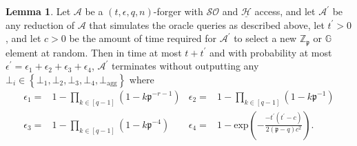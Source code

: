 \documentclass{mrl}
\theoremstyle{definition}
\numberwithin{theorem}{subsection}
\newtheorem{lemma}[theorem]{Lemma}
\newcommand{\adversary}{\mathcal{A}}
\newcommand{\group}{\mathbb{G}}
\begin{document}
\begin{lemma}\label{firstNonFail}
Let $\mathcal{A}$ be a $(t,\epsilon,q,n)$-forger with $\mathcal{SO}$ and $\underline{\mathcal{H}}$ access, and let $\adversary^\prime$ be any reduction of $\mathcal{A}$ that simulates the oracle queries as described above, let $t^\prime > 0$, and let $c > 0$ be the amount of time required for $\adversary^\prime$ to select a new $\mathbb{Z}_\mathfrak{p}$ or $\group$ element at random. Then in time at most $t+t^\prime$ and with probability at most $\epsilon^\prime = \epsilon_1 + \epsilon_2 + \epsilon_3 + \epsilon_4$, $\adversary^\prime$ terminates without outputting any $\bot_i \in \left\{\bot_1, \bot_2, \bot_3, \bot_4, \bot_{\text{agg}}\right\}$ where
\begin{align*}
\epsilon_1 =& 1 - \prod_{k \in [q-1]} (1-k \mathfrak{p}^{-r-1}) &
\epsilon_2 =& 1 - \prod_{k \in [q-1]} (1-k \mathfrak{p}^{-1}) \\
\epsilon_3 =& 1 - \prod_{k \in [q-1]} (1-k \mathfrak{p}^{-4}) &
\epsilon_4 =& 1 - \text{exp}(-\frac{-t^\prime(t^\prime-c)}{2(\mathfrak{p}-q)c^2}).
\end{align*}
\end{lemma}
\end{document}
